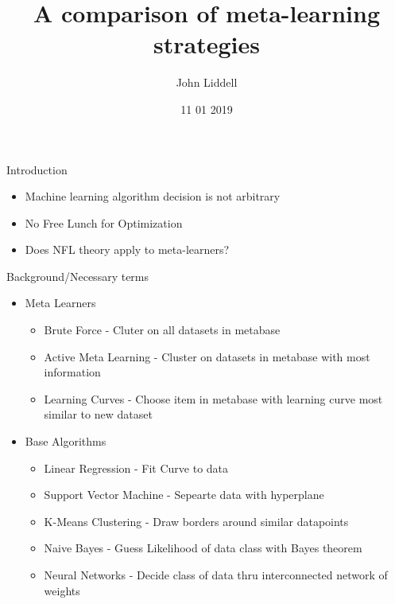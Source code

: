 \documentclass{beamer}
\title{A comparison of meta-learning strategies}
\author{John Liddell}
\institute{1200 N Dupont Hwy, Dover, DE 19901}
\date{11 01 2019}
\begin{document}

\begin{frame}
	\maketitle %
\end{frame}


\begin{frame}{Introduction}
  \begin{itemize}
  \item Machine learning algorithm decision is not arbitrary
  \item No Free Lunch for Optimization
  \item Does NFL theory apply to meta-learners?
  \end{itemize}
\end{frame}


\begin{frame}{Background/Necessary terms}
  \begin{itemize}
  \item Meta Learners
    \begin{itemize}
    \item Brute Force - Cluter on all datasets in metabase
    \item Active Meta Learning - Cluster on datasets in metabase with most
      information
    \item Learning Curves - Choose item in metabase with learning curve
      most similar to new dataset
    \end{itemize}
  \item Base Algorithms
    \begin{itemize}
    \item Linear Regression - Fit Curve to data
    \item Support Vector Machine - Sepearte data with hyperplane
    \item K-Means Clustering - Draw borders around similar datapoints
    \item Naive Bayes - Guess Likelihood of data class with Bayes theorem
    \item Neural Networks - Decide class of data thru interconnected network
      of weights
    \end{itemize}
  \end{itemize}
\end{frame}
\end{document}

